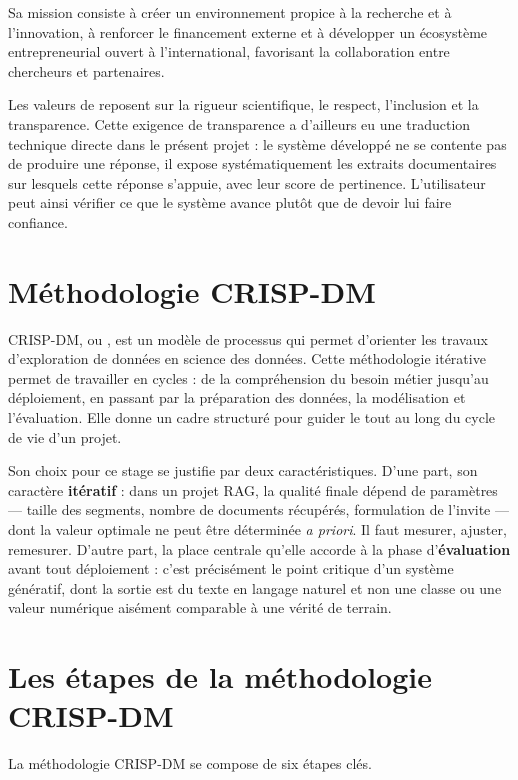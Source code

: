 Sa mission consiste à créer un environnement propice à la recherche et à
l'innovation, à renforcer le financement externe et à développer un écosystème
entrepreneurial ouvert à l'international, favorisant la collaboration entre
chercheurs et partenaires.

Les valeurs de \organism{} reposent sur la rigueur scientifique, le respect,
l'inclusion et la transparence. Cette exigence de transparence a d'ailleurs eu
une traduction technique directe dans le présent projet : le système développé
ne se contente pas de produire une réponse, il expose systématiquement les
extraits documentaires sur lesquels cette réponse s'appuie, avec leur score de
pertinence. L'utilisateur peut ainsi vérifier ce que le système avance plutôt
que de devoir lui faire confiance.

\section{Méthodologie CRISP-DM}

CRISP-DM, ou , est un modèle
de processus qui permet d'orienter les travaux d'exploration de données en
science des données. Cette méthodologie itérative permet de travailler en
cycles : de la compréhension du besoin métier jusqu'au déploiement, en passant
par la préparation des données, la modélisation et l'évaluation. Elle donne un
cadre structuré pour guider le  tout au long du cycle de vie
d'un projet.

Son choix pour ce stage se justifie par deux caractéristiques. D'une part, son
caractère \textbf{itératif} : dans un projet RAG, la qualité finale dépend de
paramètres --- taille des segments, nombre de documents récupérés, formulation
de l'invite --- dont la valeur optimale ne peut être déterminée
\emph{a priori}. Il faut mesurer, ajuster, remesurer. D'autre part, la place
centrale qu'elle accorde à la phase d'\textbf{évaluation} avant tout
déploiement : c'est précisément le point critique d'un système génératif, dont
la sortie est du texte en langage naturel et non une classe ou une valeur
numérique aisément comparable à une vérité de terrain.

\section{Les étapes de la méthodologie CRISP-DM}

La méthodologie CRISP-DM se compose de six étapes clés.

